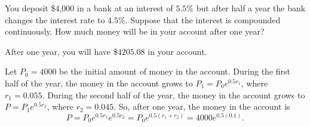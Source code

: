 \documentclass{ximera}
\begin{document}
\begin{exercise} \label{c3.1.7A}
You deposit \$4,000 in a bank at an interest of $5.5\%$ but after half 
a year the bank changes the interest rate to $4.5\%$.  Suppose that the 
interest is compounded continuously.  How much money will be in your 
account after one year?

\begin{solution}
\ans After one year, you will have \$$4205.08$ in your account.

\soln Let $P_0 = 4000$ be the initial amount of money in the account. 
During the first half of the year, the money in the account grows to $P_1 =
P_0e^{0.5r_1}$, where $r_1 = 0.055$.  During the second half of the year,
the money in the account grows to $P = P_1e^{0.5r_2}$, where $r_2 = 0.045$.
So, after one year, the money in the account is
\[
P = P_0e^{0.5r_1}e^{0.5r_2} = P_0e^{0.5(r_1 + r_2)} = 4000e^{0.5(0.1)}.
\]

\end{solution}
\end{exercise}
\end{document}
